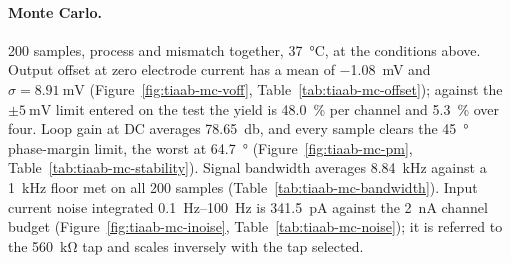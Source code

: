 %
%
%

\paragraph{Monte Carlo.} 200 samples, process and mismatch together,
\SI{37}{\celsius}, at the conditions above. Output offset at zero electrode current has
a mean of \SI{-1.08}{\milli\volt} and \(\sigma = \SI{8.91}{\milli\volt}\)
(Figure~\ref{fig:tiaab-mc-voff}, Table~\ref{tab:tiaab-mc-offset}); against the
\(\pm\SI{5}{\milli\volt}\) limit entered on the test the yield is \SI{48.0}{\percent}
per channel and \SI{5.3}{\percent} over four. Loop gain at DC averages
\SI{78.65}{\decibel}, and every sample clears the \SI{45}{\degree} phase-margin limit,
the worst at \SI{64.7}{\degree} (Figure~\ref{fig:tiaab-mc-pm},
Table~\ref{tab:tiaab-mc-stability}). Signal bandwidth averages \SI{8.84}{\kilo\hertz}
against a \SI{1}{\kilo\hertz} floor met on all 200 samples
(Table~\ref{tab:tiaab-mc-bandwidth}). Input current noise integrated
\SIrange{0.1}{100}{\hertz} is \SI{341.5}{\pico\ampere} against the
\SI{2}{\nano\ampere} channel budget (Figure~\ref{fig:tiaab-mc-inoise},
Table~\ref{tab:tiaab-mc-noise}); it is referred to the \SI{560}{\kilo\ohm} tap and
scales inversely with the tap selected.

